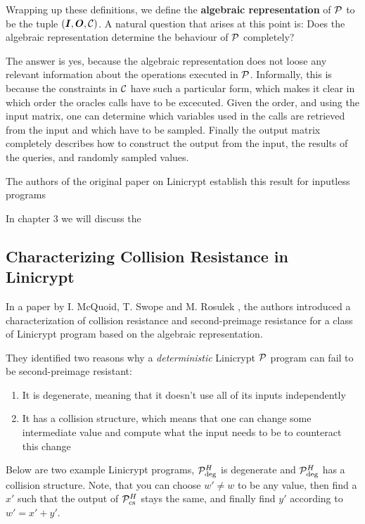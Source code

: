 Wrapping up these definitions,
we define the \textbf{algebraic representation} of $\P$ to be the tuple $(\Inp, \O, \C)$.
A natural question that arises at this point is:
Does the algebraic representation determine the behaviour of $\P$ completely?

The answer is yes, because the algebraic representation does not loose any relevant information about the operations executed in $\P$.
Informally, this is because the constraints in $\C$ have such a particular form, which makes it clear in which order the oracles calls have to be excecuted.
Given the order, and using the input matrix, one can determine which variables used in the calls are retrieved from the input and which have to be sampled.
Finally the output matrix completely describes how to construct the output from the input,
the results of the queries, and randomly sampled values. 

The authors of the original paper on Linicrypt \cite{C:CarRos16} establish this result for inputless programs

In chapter 3 we will discuss the 


\subsection{Characterizing Collision Resistance in Linicrypt}

In a paper by I. McQuoid, T. Swope and M. Rosulek
\cite[Characterizing Collision and Second-Preimage Resistance in Linicrypt]{RMS20},
the authors introduced a characterization of collision resistance
and second-preimage resistance for a class of Linicrypt program based on the algebraic representation.

They identified two reasons why a \textit{deterministic} Linicrypt $\P$ program can fail to be second-preimage resistant:
\begin{enumerate}
  \item It is degenerate, meaning that it doesn't use all of its inputs independently
  \item It has a collision structure,
    which means that one can change some intermediate value and compute what the input needs to be to counteract this change
\end{enumerate}

Below are two example Linicrypt programs, $\P^\H_\textrm{deg}$ is degenerate and $\P^\H_\textrm{deg}$ has a collision structure.
Note, that you can choose $w' \neq w$ to be any value,
then find a $x'$ such that the output of $\P^\H_{\textrm{cs}}$ stays the same,
and finally find $y'$ according to $w' = x' + y'$.

